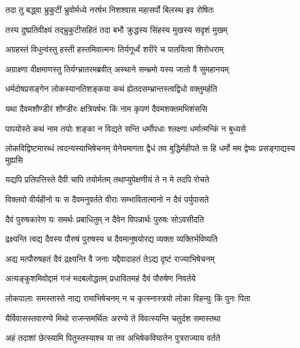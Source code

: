 \twolineshloka
{तदा तु बद्ध्वा भ्रुकुटीं भ्रुवोर्मध्ये नरर्षभ}
{निशश्वास महासर्पो बिलस्थ इव रोषितः} %

\twolineshloka
{तस्य दुष्प्रतिवीक्ष्यं तद्भ्रुकुटीसहितं तदा}
{बभौ क्रुद्धस्य सिंहस्य मुखस्य सदृशं मुखम्} %

\twolineshloka
{अग्रहस्तं विधुन्वंस्तु हस्ती हस्तमिवात्मनः}
{तिर्यगूर्ध्वं शरीरे च पातयित्वा शिरोधराम्} %

\twolineshloka
{अग्राक्ष्णा वीक्षमाणस्तु तिर्यग्भ्रातरमब्रवीत्}
{अस्थाने सम्भ्रमो यस्य जातो वै सुमहानयम्} %

\twolineshloka
{धर्मदोषप्रसङ्गेन लोकस्यानतिशङ्कया}
{कथं ह्येतदसम्भ्रान्तस्त्वद्विधो वक्तुमर्हति} %

\twolineshloka
{यथा दैवमशौण्डीरं शौण्डीरः क्षत्रियर्षभः}
{किं नाम कृपणं दैवमशक्तमभिशंससि} %

\twolineshloka
{पापयोस्ते कथं नाम तयोः शङ्का न विद्यते}
{सन्ति धर्मोपधाः श्लक्ष्णा धर्मात्मन्किं न बुध्यसे} %

\threelineshloka
{लोकविद्विष्टमारब्धं त्वदन्यस्याभिषेचनम्}
{येनेयमागता द्वैधं तव बुद्धिर्महीपते}
{स हि धर्मो मम द्वेष्यः प्रसङ्गाद्यस्य मुह्यसि} %

\twolineshloka
{यद्यपि प्रतिपत्तिस्ते दैवी चापि तयोर्मतम्}
{तथाप्युपेक्षणीयं ते न मे तदपि रोचते} %

\twolineshloka
{विक्लवो वीर्यहीनो यः स दैवमनुवर्तते}
{वीराः सम्भावितात्मानो न दैवं पर्युपासते} %

\twolineshloka
{दैवं पुरुषकारेण यः समर्थः प्रबाधितुम्}
{न दैवेन विपन्नार्थः पुरुषः सोऽवसीदति} %

\twolineshloka
{द्रक्ष्यन्ति त्वद्य दैवस्य पौरुषं पुरुषस्य च}
{दैवमानुषयोरद्य व्यक्ता व्यक्तिर्भविष्यति} %

\twolineshloka
{अद्य मत्पौरुषहतं दैवं द्रक्ष्यन्ति वै जनाः}
{यद्दैवादाहतं तेऽद्य दृष्टं राज्याभिषेचनम्} %

\twolineshloka
{अत्यङ्कुशमिवोद्दामं गजं मदबलोद्धतम्}
{प्रधावितमहं दैवं पौरुषेण निवर्तये} %

\twolineshloka
{लोकपालाः समस्तास्ते नाद्य रामाभिषेचनम्}
{न च कृत्स्नास्त्रयो लोका विहन्युः किं पुनः पिता} %

\twolineshloka
{यैर्विवासस्तवारण्ये मिथो राजन्समर्थितः}
{अरण्ये ते विवत्स्यन्ति चतुर्दश समास्तथा} %

\twolineshloka
{अहं तदाशां छेत्स्यामि पितुस्तस्याश्च या तव}
{अभिषेकविघातेन पुत्रराज्याय वर्तते} %

